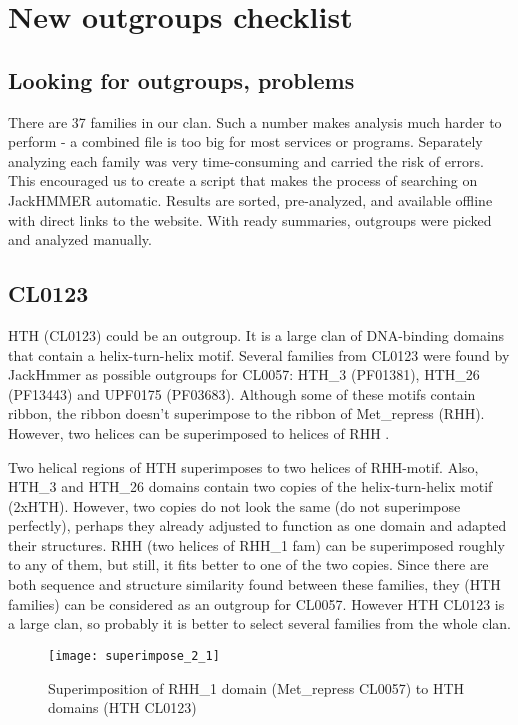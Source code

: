         \section{New outgroups checklist}

            \subsection{Looking for outgroups, problems}
There are 37 families in our clan.
Such a number makes analysis much harder to perform - a combined file is too big for most services or programs.
Separately analyzing each family was very time-consuming and carried the risk of errors.
This encouraged us to create a script that makes the process of searching on JackHMMER automatic.
Results are sorted, pre-analyzed, and available offline with direct links to the website.
With ready summaries, outgroups were picked and analyzed manually.

            \subsection{CL0123}
HTH (CL0123) could be an outgroup.
It is a large clan of DNA-binding domains that contain a helix-turn-helix motif.
Several families from CL0123 were found by JackHmmer as possible outgroups for CL0057: HTH\_3 (PF01381), HTH\_26 (PF13443) and UPF0175 (PF03683).
Although some of these motifs contain ribbon, the ribbon doesn't superimpose to the ribbon of Met\_repress (RHH).
However, two helices can be superimposed to helices of RHH .

Two helical regions of HTH superimposes to two helices of RHH-motif.
Also, HTH\_3 and HTH\_26 domains contain two copies of the helix-turn-helix motif (2xHTH).
However, two copies do not look the same (do not superimpose perfectly), perhaps they already adjusted to function as one domain and adapted their structures.
RHH (two helices of RHH\_1 fam) can be superimposed roughly to any of them, but still, it fits better to one of the two copies.
Since there are both sequence and structure similarity found between these families, they (HTH families) can be considered as an outgroup for CL0057.
However HTH CL0123 is a large clan, so probably it is better to select several families from the whole clan.

\begin{figure}[H]
\texttt{[image: superimpose\_2\_1]}
\caption{Superimposition of RHH\_1 domain (Met\_repress CL0057) to HTH domains (HTH CL0123)}
\end{figure}

